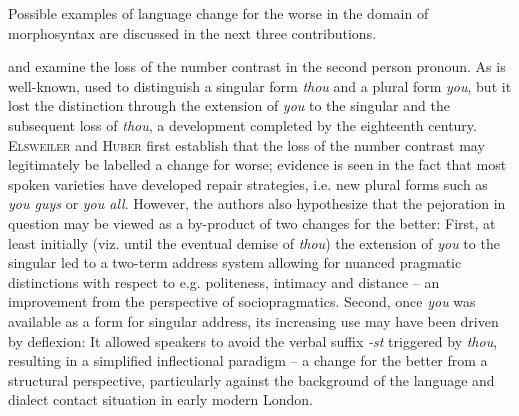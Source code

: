 \documentclass[output=paper,hidelinks]{langscibook}
\begin{document}
Possible examples of language change for the worse in the domain of morphosyntax are discussed in the next three contributions.

\textsc{} and \textsc{} examine the loss of the number contrast in the  second person pronoun. As is well-known,  used to distinguish a singular form \textit{thou} and a plural form \textit{you}, but it lost the distinction through the extension of \textit{you} to the singular and the subsequent loss of \textit{thou}, a development completed by the eighteenth century. \textsc{Elsweiler} and \textsc{Huber} first establish that the loss of the number contrast may legitimately be labelled a change for worse; evidence is seen in the fact that most spoken varieties have developed repair strategies, i.e. new plural forms such as \textit{you guys} or \textit{you all}. However, the authors also hypothesize that the pejoration in question may be viewed as a by-product of two changes for the better: First, at least initially (viz. until the eventual demise of \textit{thou})  the extension of \textit{you} to the singular led to a two-term address system allowing for nuanced pragmatic distinctions with respect to e.g. politeness, intimacy and distance -- an improvement from the perspective of sociopragmatics. Second, once \textit{you} was available as a form for singular address, its increasing use may have been driven by deflexion: It allowed speakers to avoid the verbal suffix \textit{-st} triggered by \textit{thou}, resulting in a simplified inflectional paradigm --  a change for the better from a structural perspective, particularly against the background of the language and dialect contact situation in early modern London.
\end{document}
